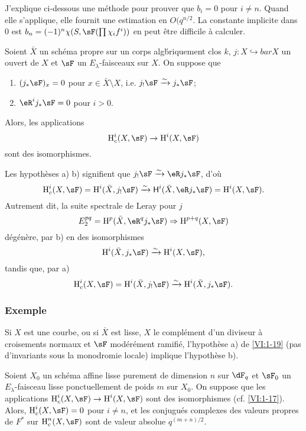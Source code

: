 J'explique ci-dessous une méthode pour prouver que $b_i=0$ pour $i\ne n$. 
Quand elle s'applique, elle fournit une estimation en $O(q^{n/2}$. La constante 
implicite dans $0$ est $b_n=(-1)^n \chi(S,\sF(\prod \chi_i f^i))$ en peut 
être difficile à calculer. 





\begin{proposition_}\label{VI:1-19}
Soient $\bar X$ un schéma propre sur un corps alg\'briquement clos $k$, 
$j:X\hookrightarrow bar X$ un ouvert de $X$ et $\sF$ un $E_\lambda$-faisceaux 
sur $X$. On suppose que 
\begin{enumerate}[\indent a)]
  \item $(j_\ast\sF)_x = 0$ pour $x\in \bar X\setminus X$, i.e. 
    $j_!\sF\iso j_\ast\sF$; 
  \item $\eR^i j_\ast \sF = 0$ pour $i>0$.
\end{enumerate}
Alors, les applications 
\[
  \h_c^i(X,\sF) \to \h^i(X,\sF)
\]
sont des isomorphismes. 
\end{proposition_}

Les hypothèses a) b) signifient que $j_! \sF \iso \eR j_\ast \sF$, d'où 
\[
  \h_c^i(X,\sF) = \h^i(\bar X,j_!\sF) \iso \hh^i(\bar X,\eR j_\ast \sF) = \h^i(X,\sF) \text{.}
\]
Autrement dit, la suite spectrale de Leray pour $j$ 
\[
  E_2^{pq} = \h^p(\bar X,\eR^q j_\ast \sF) \Rightarrow \h^{p+q}(X,\sF) 
\]
dégénère, par b) en des isomorphismes 
\[
  \h^i(\bar X,j_\ast\sF) \iso \h^i(X,\sF) \text{,}
\]
tandis que, par a) 
\[
  \h_c^i(X,\sF) = \h^i(\bar X,j_!\sF) \iso \h^i(\bar X,j_\ast\sF) \text{.}
\]





\subsubsection{Exemple}\label{VI:1-19-1}

Si $X$ est une courbe, ou si $\bar X$ est lisse, $X$ le complément d'un 
diviseur à croisements normaux et $\sF$ modérément ramifié, 
l'hypothèse a) de \ref{VI:1-19} (pas d'invariants sous la monodromie locale) 
implique l'hypothèse b). 





\begin{proposition_}\label{VI:1-20}
Soient $X_0$ un schéma affine lisse purement de dimension $n$ sur $\dF_q$ et 
$\sF_0$ un $E_\lambda$-faisceau lisse ponctuellement de poids $m$ sur $X_0$. On 
suppose que les applications $\h_c^i(X,\sF) \to \h^i(X,\sF)$ sont des 
isomorphismes (cf. \ref{VI:1-17}). Alors, $\h_c^i(X,\sF) = 0$ pour $i\ne n$, et 
les conjugués complexes des valeurs propres de $F^\ast$ sur $\h_c^n(X,\sF)$ 
sont de valeur absolue $q^{(m+n)/2}$. 
\end{proposition_}

